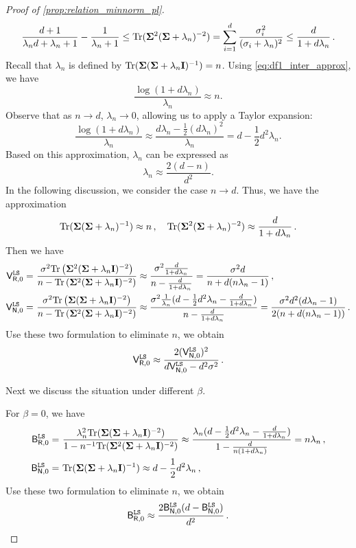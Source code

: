 \begin{proof}[Proof of \cref{prop:relation_minnorm_pl}]
\begin{equation}\label{eq:df2_inter_approx_alpha1}
\frac{d+1}{\lambda_n d +\lambda_n +1} - \frac{1}{\lambda_n+1} \leq    {\rm Tr}({\boldsymbol \Sigma}^2({\boldsymbol \Sigma}+\lambda_n)^{-2}) = \sum_{i=1}^{d} \frac{\sigma_i^2}{(\sigma_i + \lambda_n)^2} \leq \frac{d}{1+d\lambda_n}\,.
\end{equation}
Recall that \(\lambda_n\) is defined by \({\rm Tr}({\boldsymbol \Sigma}({\boldsymbol \Sigma} + \lambda_n {\mathbf I})^{-1}) = n\). Using \cref{eq:df1_inter_approx}, we have 
\[
\frac{\log(1 + d\lambda_n)}{\lambda_n} \approx n.
\]
Observe that as \(n \to d\), \(\lambda_n \to 0\), allowing us to apply a Taylor expansion:
\[
\frac{\log(1 + d\lambda_n)}{\lambda_n} \approx \frac{d\lambda_n - \frac{1}{2}(d\lambda_n)^2}{\lambda_n} = d - \frac{1}{2}d^2\lambda_n.
\]
Based on this approximation, \(\lambda_n\) can be expressed as
\[
\lambda_n \approx \frac{2(d - n)}{d^2}.
\]
In the following discussion, we consider the case $n \to d$. Thus, we have the approximation
\[
{\rm Tr}({\boldsymbol \Sigma}({\boldsymbol \Sigma}+\lambda_n)^{-1}) \approx n\,, \quad {\rm Tr}({\boldsymbol \Sigma}^2({\boldsymbol \Sigma}+\lambda_n)^{-2}) \approx \frac{d}{1+d\lambda_n}\,.
\]
Then we have
\[
\begin{aligned}
    \mathsf V_{\mathsf R,0}^{\tt LS} =&~ \frac{\sigma^2 {\rm Tr}\left({\boldsymbol \Sigma}^2 ({\boldsymbol \Sigma} + \lambda_n{\mathbf I})^{-2}\right)}{n - {\rm Tr}\left({\boldsymbol \Sigma}^2 ({\boldsymbol \Sigma} + \lambda_n{\mathbf I})^{-2}\right)} \approx \frac{\sigma^2\frac{d}{1+d\lambda_n}}{n-\frac{d}{1+d\lambda_n}} = \frac{\sigma^2 d}{n+d(n\lambda_n-1)}\,,\\
    \mathsf V_{\mathsf N,0}^{\tt LS} =&~ \frac{\sigma^2 {\rm Tr}\left({\boldsymbol \Sigma} ({\boldsymbol \Sigma} + \lambda_n{\mathbf I})^{-2}\right)}{n - {\rm Tr}\left({\boldsymbol \Sigma}^2 ({\boldsymbol \Sigma} + \lambda_n{\mathbf I})^{-2}\right)} \approx \frac{\sigma^2\frac{1}{\lambda_n}(d - \frac{1}{2}d^2\lambda_n - \frac{d}{1+d\lambda_n})}{n-\frac{d}{1+d\lambda_n}} = \frac{\sigma^2d^2(d\lambda_n-1)}{2(n+d(n\lambda_n-1))}\,.
\end{aligned}
\]
Use these two formulation to eliminate $n$, we obtain
\[
\mathsf V_{\mathsf R, 0}^{\tt LS} \approx \frac{2(\mathsf V_{\mathsf N, 0}^{\tt LS})^2}{d\mathsf V_{\mathsf N, 0}^{\tt LS}-d^2\sigma^2}\,.
\]

Next we discuss the situation under different $\beta$.

For $\beta=0$, we have
\[
\begin{aligned}
    \mathsf B_{\mathsf R,0}^{\tt LS} =&~ \frac{\lambda_n^2{\rm Tr}({\boldsymbol \Sigma}({\boldsymbol \Sigma}+\lambda_n{\mathbf I})^{-2})}{1-n^{-1}{\rm Tr}({\boldsymbol \Sigma}^2({\boldsymbol \Sigma}+\lambda_n{\mathbf I})^{-2})} \approx \frac{\lambda_n(d - \frac{1}{2}d^2\lambda_n - \frac{d}{1+d\lambda_n})}{1-\frac{d}{n(1+d\lambda_n)}} = n\lambda_n\,,\\
    \mathsf B_{\mathsf N,0}^{\tt LS} =&~ {\rm Tr}({\boldsymbol \Sigma}({\boldsymbol \Sigma}+\lambda_n{\mathbf I})^{-1}) \approx d - \frac{1}{2}d^2\lambda_n\,,\\
\end{aligned}
\]
Use these two formulation to eliminate $n$, we obtain
\[
\mathsf B_{\mathsf R,0}^{\tt LS} \approx \frac{2\mathsf B_{\mathsf N, 0}^{\tt LS}(d-\mathsf B_{\mathsf N, 0}^{\tt LS})}{d^2}\,.
\]


\end{proof}
